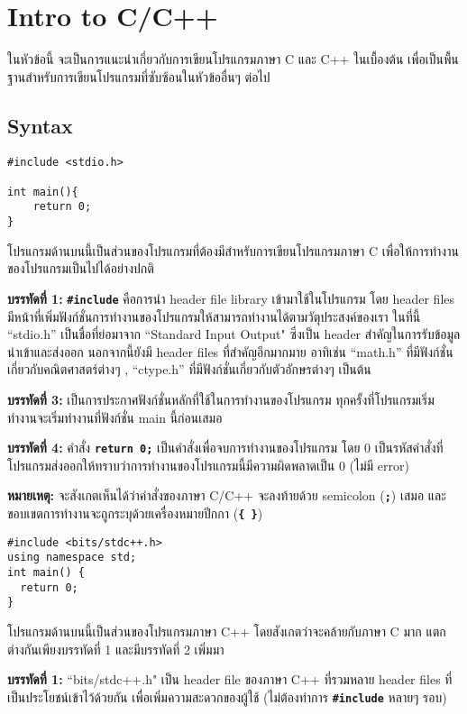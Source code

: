 \chapter{Intro to C/C++}
ในหัวข้อนี้ จะเป็นการแนะนำเกี่ยวกับการเขียนโปรแกรมภาษา C และ C++ ในเบื้องต้น เพื่อเป็นพื้นฐานสำหรับการเขียนโปรแกรมที่ซับซ้อนในหัวข้ออื่นๆ ต่อไป
\section{Syntax}
\begin{lstlisting}
#include <stdio.h>

int main(){
	return 0;
}
\end{lstlisting}
โปรแกรมด้านบนนี้เป็นส่วนของโปรแกรมที่ต้องมีสำหรับการเขียนโปรแกรมภาษา C เพื่อให้การทำงานของโปรแกรมเป็นไปได้อย่างปกติ

\textbf{บรรทัดที่ 1:} \textbf{\texttt{\#include}} คือการนำ header file library  เข้ามาใช้ในโปรแกรม โดย header files มีหน้าที่เพิ่มฟังก์ชั่นการทำงานของโปรแกรมให้สามารถทำงานได้ตามวัตุประสงค์ของเรา ในที่นี้ ``stdio.h'' เป็นชื่อที่ย่อมาจาก ``Standard Input Output" ซึ่งเป็น header สำคัญในการรับข้อมูลนำเข้าและส่งออก นอกจากนี้ยังมี header files ที่สำคัญอีกมากมาย อาทิเช่น ``math.h'' ที่มีฟังก์ชั่นเกี่ยวกับคณิตศาสตร์ต่างๆ , ``ctype.h'' ที่มีฟังก์ชั่นเกี่ยวกับตัวอักษรต่างๆ เป็นต้น

\textbf{บรรทัดที่ 3:} เป็นการประกาศฟังก์ชั่นหลักที่ใช้ในการทำงานของโปรแกรม ทุกครั้งที่โปรแกรมเริ่มทำงานจะเริ่มทำงานที่ฟังก์ชั่น main นี้ก่อนเสมอ

\textbf{บรรทัดที่ 4:} คำสั่ง \textbf{\texttt{return 0;}} เป็นคำสั่งเพื่อจบการทำงานของโปรแกรม โดย 0 เป็นรหัสคำสั่งที่โปรแกรมส่งออกให้ทราบว่าการทำงานของโปรแกรมนี้มีความผิดพลาดเป็น 0 (ไม่มี error)

\noindent\textbf{หมายเหตุ:} จะสังเกตเห็นได้ว่าคำสั่งของภาษา C/C++ จะลงท้ายด้วย semicolon (\textbf{\texttt{;}}) เสมอ และขอบเขตการทำงานจะถูกระบุด้วยเครื่องหมายปีกกา (\textbf{\texttt{\{ \}}})

\newpage
\begin{lstlisting}
#include <bits/stdc++.h>
using namespace std;
int main() {
  return 0;
}
\end{lstlisting}
โปรแกรมด้านบนนี้เป็นส่วนของโปรแกรมภาษา C++ โดยสังเกตว่าจะคล้ายกับภาษา C มาก แตกต่างกันเพียงบรรทัดที่ 1 และมีบรรทัดที่ 2 เพิ่มมา

\textbf{บรรทัดที่ 1:} ``bits/stdc++.h" เป็น header file ของภาษา C++ ที่รวมหลาย header files ที่เป็นประโยชน์เข้าไว้ด้วยกัน เพื่อเพิ่มความสะดวกของผู้ใช้ (ไม่ต้องทำการ \textbf{\texttt{\#include}} หลายๆ รอบ)

